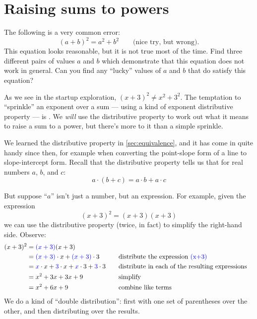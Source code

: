 \section{Raising sums to powers}
\label{sec:exposumstopowers}

\begin{boxexplore}
The following is a very common error: \[(a+b)^2 = a^2 + b^2 \qquad\text{(nice try, but wrong)}.\] This equation looks reasonable, but it is not true most of the time. Find three different pairs of values $a$ and $b$ which demonstrate that this equation does not work in general. Can you find any ``lucky'' values of $a$ and $b$ that do satisfy this equation?
\end{boxexplore}

As we see in the startup exploration, $(x + 3)^2 \neq x^2 + 3^2$. The temptation to ``sprinkle'' an exponent over a sum --- using a kind of exponent distributive property --- is \evilandwrong. We \textit{will} use the distributive property to work out what it means to raise a sum to a power, but there's more to it than a simple sprinkle.

We learned the distributive property in \cref{sec:equivalence}, and it has come in quite handy since then, for example when converting the point-slope form of a line to slope-intercept form. Recall that the distributive property tells us that for real numbers $a$, $b$, and $c$:
\[a \cdot (b+c) = a\cdot b + a\cdot c\]

But suppose ``$a$'' isn't just a number, but an expression. For example, given the expression
\[(x+3)^2 = (x+3)(x+3)\]
we can use the distributive property (twice, in fact) to simplify the right-hand side. Observe:
\[\begin{aligned}
(x+3)^2
&= {\color{blue}(x+3)}{(x+3)}
\\
&= {\color{blue}(x+3)} \cdot x + {\color{blue}(x+3)} \cdot 3
&& \quad\text{distribute the expression {\color{blue}(x+3)}}
\\
&= {\color{blue}x} \cdot x + {\color{blue}3} \cdot x + {\color{blue}x} \cdot 3 + {\color{blue}3} \cdot 3
&& \quad\text{distribute in each of the resulting expressions}
\\
&= x^2 + 3x + 3x + 9
&& \quad\text{simplify}
\\
&= x^2 + 6x + 9
&& \quad\text{combine like terms}
\end{aligned}\]
We do a kind of ``double distribution'': first with one set of parentheses over the other, and then distributing over the results.


